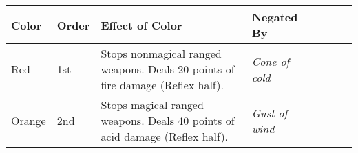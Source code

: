 \begin{longtable}{llllllll}
\hline
\multicolumn{1}{|p{0.515in}|}{\begin{minipage}[t]{0.515in}\raggedright
\textbf{Color}\end{minipage}} & \multicolumn{1}{p{0.480in}|}{\begin{minipage}[t]{0.480in}\raggedright
\textbf{Order}\end{minipage}} & \multicolumn{1}{p{2.513in}|}{\begin{minipage}[t]{2.513in}\raggedright
\textbf{Effect of Color}\end{minipage}} & \multicolumn{1}{p{0.823in}|}{\begin{minipage}[t]{0.823in}\raggedright
\textbf{Negated By}\end{minipage}}\\
\hline
\multicolumn{1}{p{0.042in}|}{\begin{minipage}[t]{0.042in}\raggedright
Red\end{minipage}} & \multicolumn{1}{p{0.042in}|}{\begin{minipage}[t]{0.042in}\raggedright
1st\end{minipage}} & \multicolumn{1}{p{0.042in}|}{\begin{minipage}[t]{0.042in}\raggedright
Stops nonmagical ranged weapons.\linebreak
Deals 20 points of fire damage (Reflex half).\end{minipage}} & \multicolumn{1}{p{0.042in}|}{\begin{minipage}[t]{0.042in}\raggedright
\textit{Cone of cold}\end{minipage}}\\
\hline
\multicolumn{1}{|p{0.515in}|}{\begin{minipage}[t]{0.515in}\raggedright
Orange\end{minipage}} & \multicolumn{1}{p{0.480in}|}{\begin{minipage}[t]{0.480in}\raggedright
2nd\end{minipage}} & \multicolumn{1}{p{2.513in}|}{\begin{minipage}[t]{2.513in}\raggedright
Stops magical ranged weapons.\linebreak
Deals 40 points of acid damage (Reflex half).\end{minipage}} & \multicolumn{1}{p{0.823in}|}{\begin{minipage}[t]{0.823in}\raggedright
\textit{Gust of wind}\end{minipage}}\\

\end{longtable}
